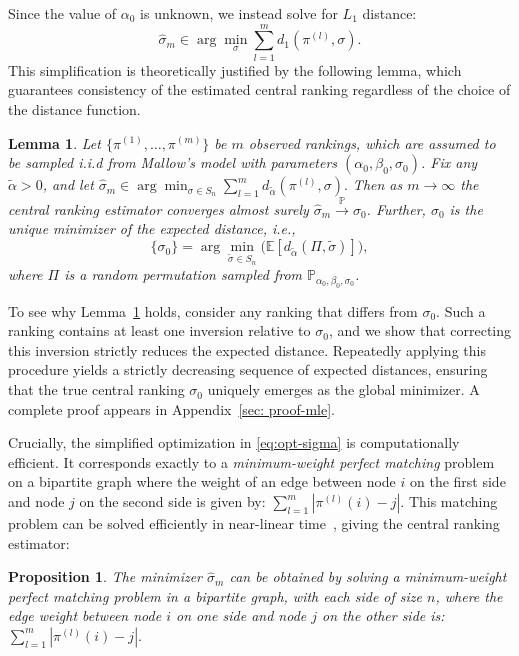 \documentclass{article}
\renewcommand{\P}{\mathbb{P}}
\newtheorem{lemma}[theorem]{Lemma}     %
\newtheorem{proposition}[theorem]{Proposition} %
\begin{document}
Since the value of $\alpha_0$ is unknown, we instead solve for $L_1$ distance:
\begin{equation}\label{eq:opt-sigma}
    \hat{\sigma}_m \in \arg\min_{\sigma} \sum_{l=1}^m d_1(\pi^{(l)},\sigma).
\end{equation}
This simplification is theoretically justified by the following lemma, which guarantees consistency of the estimated central ranking regardless of the choice of the distance function.

\begin{lemma}\label{lm:unqiue minimizer} Let \(\{\pi^{(1)}, \dots, \pi^{(m)}\}\) be $m$ observed
rankings, which are assumed to be sampled i.i.d from Mallow's model with parameters $(\alpha_0,\beta_0,\sigma_0)$.
Fix any \({\tilde \alpha} > 0\), and let $\hat{\sigma}_m \in \arg\min_{\sigma \in {S_n}} \sum_{l=1}^m d_{\tilde \alpha}(\pi^{(l)}, \sigma).$ Then as $m\to\infty$ the central ranking estimator converges almost surely $\hat{\sigma}_m\overset{\P}{\to}\sigma_0$. Further, \(\sigma_0\) is the unique minimizer of the expected distance, i.e.,
\[
\{\sigma_0\} = \arg\min_{\tilde \sigma \in {S_n}} \Big(\mathbb{E}[d_{\tilde{\alpha}}(\Pi, \tilde\sigma)]\Big),
\]
where $\Pi$ is a random permutation sampled from $\P_{\alpha_0,\beta_0,\sigma_0}$.
\end{lemma}
To see why Lemma~\ref{lm:unqiue minimizer} holds, consider any ranking that differs from  \(\sigma_0\). Such a ranking contains at least one inversion relative to  \(\sigma_0\),  and we show that correcting this inversion strictly reduces the expected distance.
 Repeatedly applying this procedure yields a strictly decreasing sequence of expected distances, ensuring that the true central ranking \(\sigma_0\)  uniquely emerges as the global minimizer. A complete proof appears in Appendix~\ref{sec: proof-mle}.


Crucially, the simplified optimization in \eqref{eq:opt-sigma} is computationally efficient. It corresponds exactly to a \emph{minimum-weight perfect matching} problem on a bipartite graph where the weight of an edge between node \(i\) on the first side and node \(j\) on the second side is given by:
$\sum_{l=1}^m |\pi^{(l)}(i) - j|$. 
This matching problem can be solved efficiently in near-linear time~\cite{duan2010approximating}, giving the central ranking estimator:
\begin{proposition}
\label{prop:update-sigma-matching}
The minimizer \(\hat{\sigma}_m\) can be obtained by solving a minimum-weight perfect matching problem in a bipartite graph, with each side of size \(n\), where the edge weight between node \(i\) on one side and node \(j\) on the other side is:
$\sum_{l=1}^m |\pi^{(l)}(i) - j|.$
\end{proposition}
\end{document}
